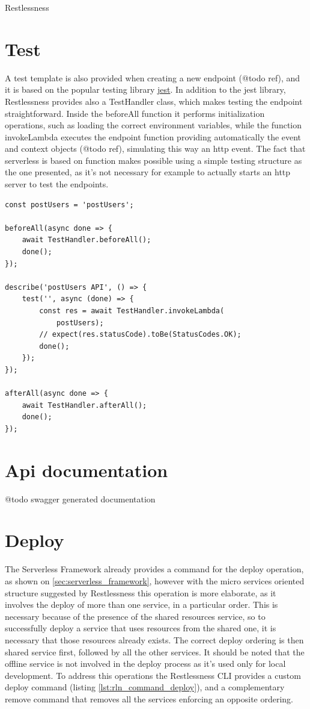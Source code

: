 \begin{chapter}{Restlessness}
    \section{Test}
    A test template is also provided when creating a new endpoint (@todo ref), and
    it is based on the popular testing library \href{https://jestjs.io/}{jest}.
    In addition to the jest library, Restlessness provides also a TestHandler class,
    which makes testing the endpoint straightforward.
    Inside the beforeAll function it performs initialization operations, such as
    loading the correct environment variables, while the function invokeLambda
    executes the endpoint function providing automatically the event and context
    objects (@todo ref), simulating this way an http event.
    The fact that serverless is based on function makes possible using a simple
    testing structure as the one presented, as it's not necessary for example to
    actually starts an http server to test the endpoints.

    \begin{lstlisting}[caption=index.test.ts template, label={lst:endopints_test_ts}]
const postUsers = 'postUsers';

beforeAll(async done => {
    await TestHandler.beforeAll();
    done();
});

describe('postUsers API', () => {
    test('', async (done) => {
        const res = await TestHandler.invokeLambda(
            postUsers);
        // expect(res.statusCode).toBe(StatusCodes.OK);
        done();
    });
});

afterAll(async done => {
    await TestHandler.afterAll();
    done();
});
    \end{lstlisting}

    \section{Api documentation}
    @todo swagger generated documentation

    \section{Deploy}
    The Serverless Framework already provides a command for the deploy operation,
    as shown on \ref{sec:serverless_framework}, however with the micro services oriented
    structure suggested by Restlessness this operation is more elaborate, as it
    involves the deploy of more than one service, in a particular order.
    This is necessary because of the presence of the shared resources service, so
    to successfully deploy a service that uses resources from the shared one, it
    is necessary that those resources already exists. The correct deploy ordering
    is then shared service first, followed by all the other services.
    It should be noted that the offline service is not involved in the deploy
    process as it's used only for local development.
    To address this operations the Restlessness CLI provides a custom deploy
    command (listing \ref{lst:rln_command_deploy}), and a complementary remove command
    that removes all the services enforcing an opposite ordering.


\end{chapter}
